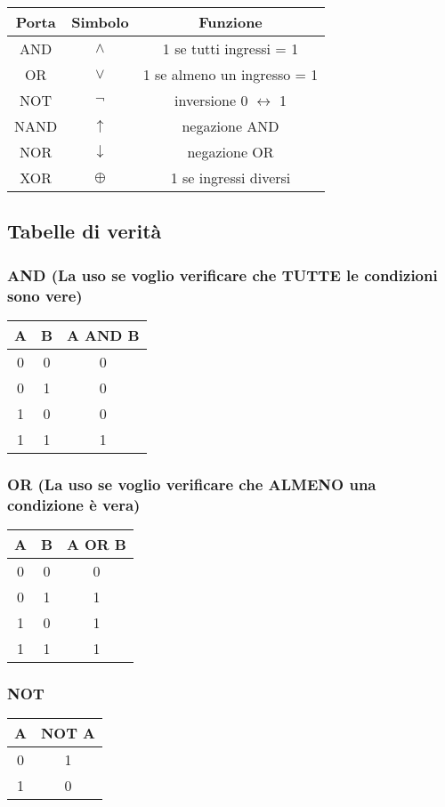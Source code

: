 \documentclass[12pt,a4paper]{article}
\begin{document}
\begin{longtable}{|c|c|c|}
\hline
Porta & Simbolo & Funzione \\
\hline
AND & $\land$ & 1 se tutti ingressi = 1 \\
OR & $\lor$ & 1 se almeno un ingresso = 1 \\
NOT & $\lnot$ & inversione 0 $\leftrightarrow$ 1 \\
NAND & $\uparrow$ & negazione AND \\
NOR & $\downarrow$ & negazione OR \\
XOR & $\oplus$ & 1 se ingressi diversi \\
\hline
\end{longtable}

\subsection{Tabelle di verità}

\subsubsection{AND (La uso se voglio verificare che TUTTE le condizioni sono vere)}
\begin{tabular}{c c | c}
A & B & A AND B \\
\hline
0 & 0 & 0 \\
0 & 1 & 0 \\
1 & 0 & 0 \\
1 & 1 & 1 \\
\end{tabular}

\subsubsection{OR (La uso se voglio verificare che ALMENO una condizione è vera)}
\begin{tabular}{c c | c}
A & B & A OR B \\
\hline
0 & 0 & 0 \\
0 & 1 & 1 \\
1 & 0 & 1 \\
1 & 1 & 1 \\
\end{tabular}

\subsubsection{NOT}
\begin{tabular}{c | c}
A & NOT A \\
\hline
0 & 1 \\
1 & 0 \\
\end{tabular}
\end{document}
